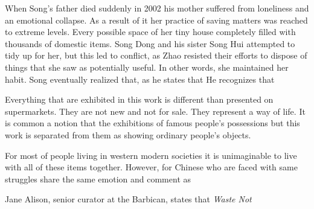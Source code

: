 When Song’s father died suddenly in 2002 his mother suffered from loneliness and an emotional collapse. As a result of it her practice of saving matters was reached to extreme levels. Every possible space of her tiny house completely filled with thousands of domestic items. Song Dong and his sister Song Hui attempted to tidy up for her, but this led to conflict, as Zhao resisted their efforts to dispose of things that she saw as potentially useful. In other words, she maintained her habit. Song eventually realized that, as he states that  He recognizes that 

Everything that are exhibited in this work is different than presented on supermarkets. They are not new and not for sale. They represent a way of life. It is common a notion that the exhibitions of famous people’s possessions but this work is separated from them as showing ordinary people’s objects.

For most of people living in western modern societies it is unimaginable to live with all of these items together. However, for Chinese who are faced with same struggles share the same emotion and comment as 

Jane Alison, senior curator at the Barbican, states that \textit{Waste Not}  \citep[as cited in][]{needham2015chinese}



